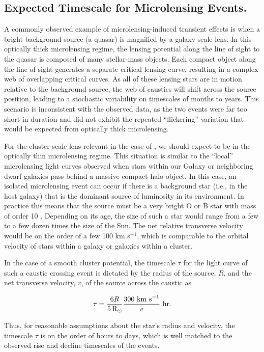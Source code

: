 
\subsection{Expected Timescale for Microlensing Events.}\label{sec:Microlensing}

A commonly observed example of microlensing-induced transient effects
is when a bright background source (a quasar) is magnified by a
galaxy-scale lens\citep{Wambsganss:2001, Kochanek:2004}.  In this
optically thick microlensing regime, the lensing potential along the
line of sight to the quasar is composed of many stellar-mass objects.
Each compact object along the line of sight generates a separate
critical lensing curve, resulting in a complex web of overlapping
critical curves. As all of these lensing stars are in motion relative
to the background source, the web of caustics will shift across the
source position, leading to a stochastic variability on timescales of
months to years.  This scenario is inconsistent with the observed
data, as the two \spock events were far too short in duration and did
not exhibit the repeated ``flickering'' variation that would be
expected from optically thick microlensing.

For the cluster-scale lens relevant in the case of \spock, we should
expect to be in the optically thin microlensing regime.  This
situation is similar to the ``local'' microlensing light curves
observed when stars within our Galaxy or neighboring dwarf galaxies
pass behind a massive compact halo object\citep{Paczynski:1986,
  Alcock:1993, Aubourg:1993, Udalski:1993}.  In this case, an isolated
microlensing event can occur if there is a background star (i.e., in
the \spock host galaxy) that is the dominant source of luminosity in
its environment. In practice this means that the source must be a very
bright O or B star with mass of order 10 \Msun.  Depending on its age,
the size of such a star would range from a few to a few dozen times
the size of the Sun.  The net relative transverse velocity would be on
the order of a few 100 km s$^{-1}$, which is comparable to the orbital
velocity of stars within a galaxy or galaxies within a cluster.

In the case of a smooth cluster potential, the timescale $\tau$ for
the light curve of such a caustic crossing event is dictated by the
radius of the source, $R$, and the net transverse velocity, $v$, of
the source across the caustic\citep{Chang:1979,Chang:1984,MiraldaEscude:1991} as

\begin{equation}
  \tau = \frac{6 R}{5\,\mbox{R$_{\odot}$}}\frac{300~{\rm km~ s}^{-1}}{v}~\rm{hr.}
\label{eqn:caustic_crossing_time}
\end{equation}

\noindent Thus, for reasonable assumptions about the star's radius and
velocity, the timescale $\tau$ is on the order of hours to days, which is well
matched to the observed rise and decline timescales of the \spock
events.
